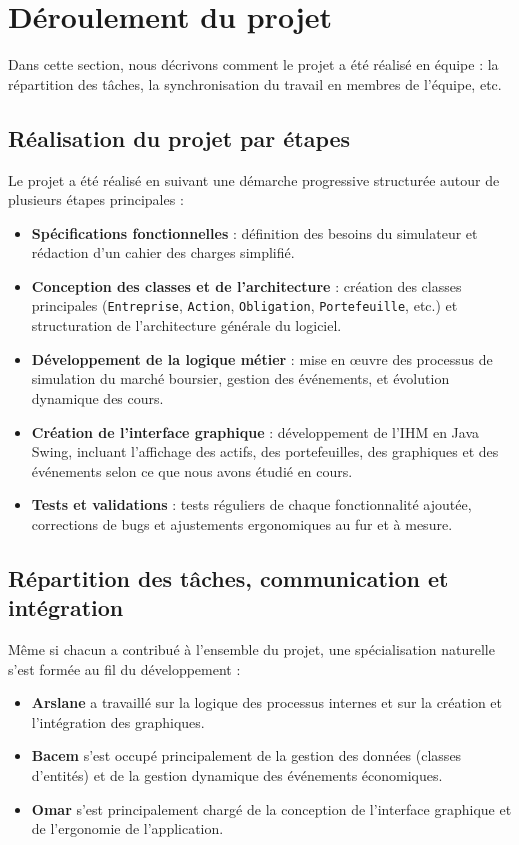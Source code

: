 \newpage
\section{Déroulement du projet}
\label{sec:deroulement}

Dans cette section, nous décrivons comment le projet a été réalisé en équipe : la répartition des tâches, la synchronisation du travail en membres de l'équipe, etc.

\subsection{Réalisation du projet par étapes}

Le projet a été réalisé en suivant une démarche progressive structurée autour de plusieurs étapes principales :
\begin{itemize}

\item \textbf{Spécifications fonctionnelles} : définition des besoins du simulateur et rédaction d'un cahier des charges simplifié.
\item \textbf{Conception des classes et de l'architecture} : création des classes principales (\texttt{Entreprise}, \texttt{Action}, \texttt{Obligation}, \texttt{Portefeuille}, etc.) et structuration de l'architecture générale du logiciel.
\item \textbf{Développement de la logique métier} : mise en œuvre des processus de simulation du marché boursier, gestion des événements, et évolution dynamique des cours.
\item \textbf{Création de l'interface graphique} : développement de l'IHM en Java Swing, incluant l'affichage des actifs, des portefeuilles, des graphiques et des événements selon ce que nous avons étudié en cours.
\item \textbf{Tests et validations} : tests réguliers de chaque fonctionnalité ajoutée, corrections de bugs et ajustements ergonomiques au fur et à mesure.
\end{itemize}

\subsection{Répartition des tâches, communication et intégration}

Même si chacun a contribué à l'ensemble du projet, une spécialisation naturelle s’est formée au fil du développement :
\begin{itemize}



\item  \textbf{Arslane} a travaillé sur la logique des processus internes et sur la création et l'intégration des graphiques.
\item  \textbf{Bacem} s'est occupé principalement de la gestion des données (classes d'entités) et de la gestion dynamique des événements économiques.
\item  \textbf{Omar} s'est principalement chargé de la conception de l'interface graphique et de l'ergonomie de l'application.
\end{itemize}



